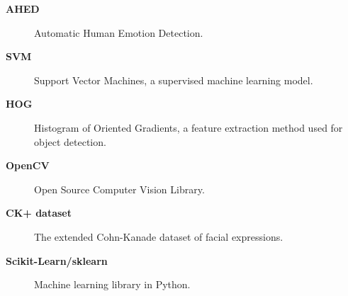 

\begin{description}
\item[\textbf{AHED}] Automatic Human Emotion Detection.
\item[\textbf{SVM}] Support Vector Machines, a supervised machine learning model. 
\item[\textbf{HOG}] Histogram of Oriented Gradients, a feature extraction method used for object detection.
\item[\textbf{OpenCV}] Open Source Computer Vision Library.
\item[\textbf{CK+ dataset}] The extended Cohn-Kanade dataset of facial expressions.
\item[\textbf{Scikit-Learn/sklearn}] Machine learning library in Python.
\end{description}

